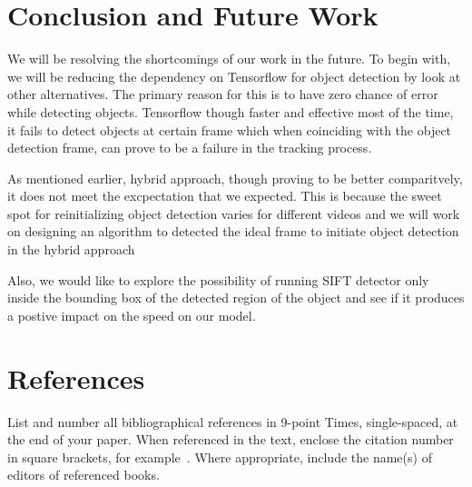 \documentclass[10pt,twocolumn,letterpaper]{article}
\begin{document}

\section{Conclusion and Future Work}
We will be resolving the shortcomings of our work in the future. To begin with, we will be reducing the dependency on Tensorflow for object detection by look at other alternatives. The primary reason for this is to have zero chance of error while detecting objects. Tensorflow though faster and effective most of the time, it fails to detect objects at certain frame which when coinciding with the object detection frame, can prove to be a failure in the tracking process.

As mentioned earlier, hybrid approach, though proving to be better comparitvely, it does not meet the excpectation that we expected. This is because the sweet spot for reinitializing object detection varies for different videos and we will work on designing an algorithm to detected the ideal frame to initiate object detection in the hybrid approach

Also, we would like to explore the possibility of running SIFT detector only inside the bounding box of the detected region of the object and see if it produces a postive impact on the speed on our model.



\section{References}

List and number all bibliographical references in 9-point Times,
single-spaced, at the end of your paper. When referenced in the text,
enclose the citation number in square brackets, for
example~\cite{Authors14}.  Where appropriate, include the name(s) of
editors of referenced books.





\


{\small


}
\end{document}
